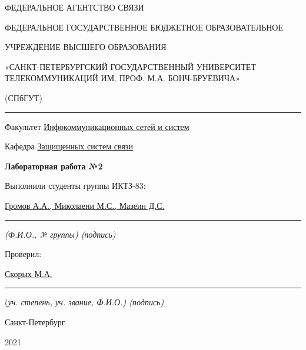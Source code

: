 \documentclass[a4paper,14pt]{extarticle}
\begin{document}
    \begin{center}
        \thispagestyle{empty}
        \begin{singlespace}
        ФЕДЕРАЛЬНОЕ АГЕНТСТВО СВЯЗИ

        ФЕДЕРАЛЬНОЕ ГОСУДАРСТВЕННОЕ БЮДЖЕТНОЕ ОБРАЗОВАТЕЛЬНОЕ

        УЧРЕЖДЕНИЕ ВЫСШЕГО ОБРАЗОВАНИЯ

        «САНКТ-ПЕТЕРБУРГСКИЙ ГОСУДАРСТВЕННЫЙ УНИВЕРСИТЕТ ТЕЛЕКОММУНИКАЦИЙ ИМ. ПРОФ. М.А. БОНЧ-БРУЕВИЧА»

        (СПбГУТ)
        \end{singlespace}
        \vspace{-1ex}
        \rule{\textwidth}{0.4pt}
        \vspace{-5ex}

        Факультет \underline{Инфокоммуникационных сетей и систем}

        Кафедра \underline{Защищенных систем связи}
        \vspace{10ex}

        \textbf{Лабораторная работа №2}\\
        


    \end{center}
    \vspace{4ex}
    \begin{flushright}
    \parbox{10 cm}{
    \begin{flushleft}
        Выполнили студенты группы ИКТЗ-83:

        \underline{Громов А.А., Миколаени М.С., Мазеин Д.С.} \hfill \rule[-0.85ex]{0.1\textwidth}{0.6pt}

        \footnotesize \textit{ (Ф.И.О., № группы) \hfill (подпись)} \normalsize

        Проверил:

        \underline{Скорых М.А.} \hfill \rule[-0.85ex]{0.1\textwidth}{0.6pt}

        (\footnotesize \textit{уч. степень, уч. звание, Ф.И.О.) \hfill (подпись)} \normalsize

    \end{flushleft}
    }
    \end{flushright}
    \begin{center}
        \vfill
        Санкт-Петербург

        2021

    \end{center}
    \newpage
\end{document}
